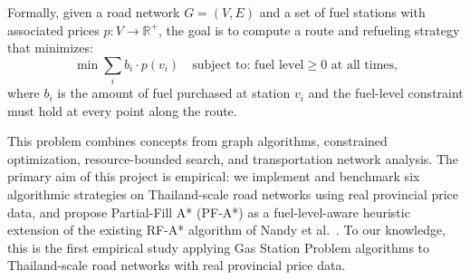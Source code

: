 Formally, given a road network $G = (V, E)$ and a set of fuel stations with associated prices
$p\colon V \to \mathbb{R}^{+}$, the goal is to compute a route and refueling strategy that
minimizes:
\[
    \min \sum_{i} b_i \cdot p(v_i)
    \quad\text{subject to: fuel level} \geq 0 \text{ at all times,}
\]
where $b_i$ is the amount of fuel purchased at station $v_i$ and the fuel-level constraint must
hold at every point along the route.

This problem combines concepts from graph algorithms, constrained optimization,
resource-bounded search, and transportation network analysis.
The primary aim of this project is empirical: we implement and benchmark six algorithmic
strategies on Thailand-scale road networks using real provincial price data, and propose
Partial-Fill A* (PF-A*) as a fuel-level-aware heuristic extension of the existing RF-A*
algorithm of Nandy et al.~\cite{nandy2023}.
To our knowledge, this is the first empirical study applying Gas Station Problem algorithms
to Thailand-scale road networks with real provincial price data.
